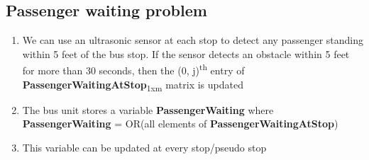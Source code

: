 \subsection{Passenger waiting problem}

\begin{enumerate}

    \item We can use an \gls{ultrasonic sensor} at each stop to detect any passenger standing within 5 feet of the bus stop. If the sensor detects an obstacle within 5 feet for more than 30 seconds, then the (0, j)\textsuperscript{th} entry of \textbf{PassengerWaitingAtStop}\textsubscript{1xm} matrix is updated
    \item The bus unit stores a variable \textbf{PassengerWaiting} where\\
          \textbf{PassengerWaiting} = OR(all elements of \textbf{PassengerWaitingAtStop})
    \item This variable can be updated at every stop/pseudo stop

\end{enumerate}